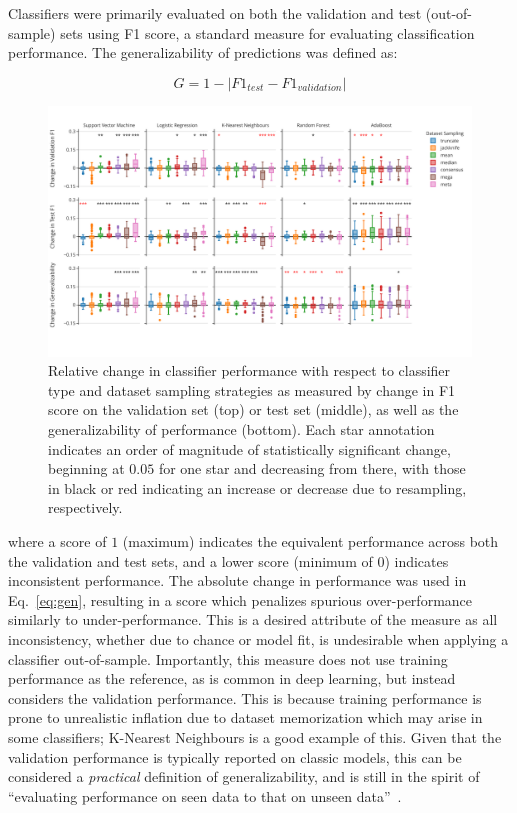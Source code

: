 \documentclass[10pt]{SelfArx} %
\newcommand{\new}[1]{\color{blue}#1\color{black}\xspace}
\begin{document}
Classifiers were primarily evaluated on both the validation and test (out-of-sample) sets using F1 score, a standard
measure for evaluating classification performance. The generalizability of predictions was defined as:

\begin{equation}
G = 1 - \lvert F1_{test} - F1_{validation} \rvert
\label{eq:gen}
\end{equation}

\begin{figure}[bth!]\centering
\includegraphics[width=\linewidth]{figures/1.pdf}
\caption{Relative change in classifier performance with respect to classifier type and dataset sampling strategies as
measured by change in F1 score on the validation set (top) or test set (middle), as well as the generalizability of
performance (bottom). Each star annotation indicates an order of magnitude of statistically significant change,
beginning at $0.05$ for one star and decreasing from there, with those in black or red indicating an increase or
decrease due to resampling, respectively.}
\label{fig:overall_perf}
\end{figure}

where a score of $1$ (maximum) indicates the equivalent performance across both the validation and test sets, and a
lower score (minimum of $0$) indicates inconsistent performance. The absolute change in performance was used in
Eq.~\ref{eq:gen}, resulting in a score which penalizes spurious over-performance similarly to under-performance. This
is a desired attribute of the measure as all inconsistency, whether due to chance or model fit, is undesirable when
applying a classifier out-of-sample. \new{Importantly, this measure does not use training performance as the reference,
as is common in deep learning, but instead considers the validation performance. This is because training performance
is prone to unrealistic inflation due to dataset memorization which may arise in some classifiers; K-Nearest Neighbours
is a good example of this. Given that the
validation performance is typically reported on classic models, this can be considered a \textit{practical} definition
of generalizability, and is still in the spirit of ``evaluating performance on seen data to that on unseen
data''~\cite{shorten2019survey}}.
\end{document}
